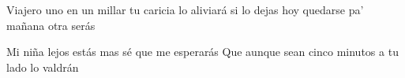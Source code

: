     Viajero uno en un millar
    tu caricia lo aliviará
    si lo dejas hoy quedarse
    pa' mañana otra serás
\endverse

\beginverse
    Mi niña lejos estás
    mas sé que me esperarás
    Que aunque sean cinco minutos
    a tu lado lo valdrán
\endverse